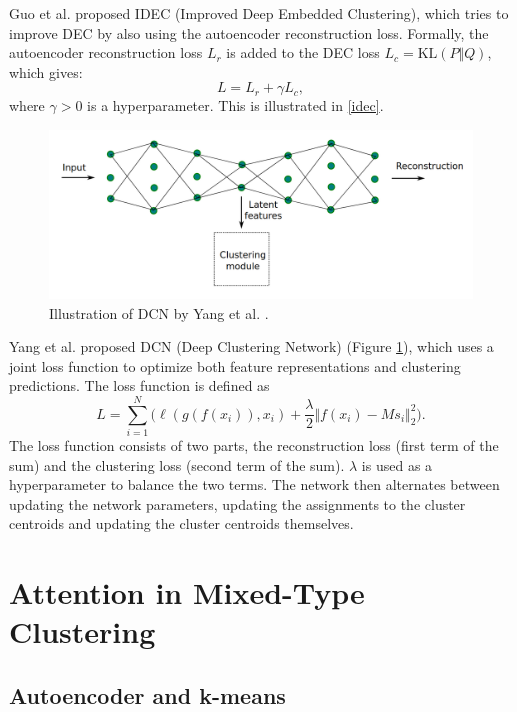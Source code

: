 Guo et al. \cite{idec} proposed IDEC (Improved Deep Embedded Clustering), which tries to improve DEC by also using the autoencoder reconstruction loss. Formally, the autoencoder reconstruction loss $L_r$ is added to the DEC loss $L_c = \text{KL}(P \Vert Q)$, which gives:
$$L = L_r + \gamma L_c,$$
where $\gamma > 0$ is a hyperparameter. This is illustrated in \ref{idec}.

\begin{figure}
\centering
	\includegraphics[width=0.9\linewidth]{dcn.png}
	\caption{Illustration of DCN by Yang et al. \cite{dcn}.}
	\label{dcn}
\end{figure}

Yang et al. \cite{dcn} proposed DCN (Deep Clustering Network) (Figure \ref{dcn}), which uses a joint loss function to optimize both feature representations and clustering predictions. The loss function is defined as
$$L = \sum^N_{i=1} \Big(\ell(g(f(x_i)), x_i)+ \frac{\lambda}{2}\Vert f(x_i)-Ms_i\Vert^2_2\Big).$$
The loss function consists of two parts, the reconstruction loss (first term of the sum) and the clustering loss (second term of the sum). $\lambda$ is used as a hyperparameter to balance the two terms. The network then alternates between updating the network parameters, updating the assignments to the cluster centroids and updating the cluster centroids themselves.

\chapter{Attention in Mixed-Type Clustering}

\section{Autoencoder and k-means}

